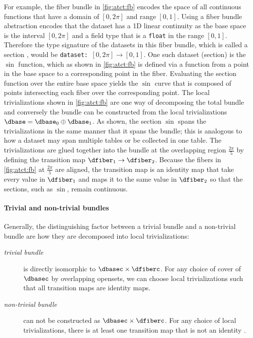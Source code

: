 For example, the fiber bundle in \autoref{fig:atct:fb} encodes the space of all continuous functions that have a domain of $[0, 2\pi]$ and range $[0,1]$. Using a fiber bundle abstraction encodes that the dataset has a 1D linear continuity as the base space \dbase is the interval $[0,2\pi]$ and a field type that is a \texttt{float} in the range $[0,1]$. Therefore the type signature of the datasets in this fiber bundle, which is called a section \dsection, would be \texttt{dataset: $[0, 2\pi] \rightarrow [0,1]$}. One such dataset (section) is the $\sin$ function, which as shown in \autoref{fig:atct:fb} is defined via a function \dsection from a point in the base space to a corresponding point in the fiber. Evaluating the section function over the entire base space yields the $\sin$ curve that is composed of points intersecting each fiber over the corresponding point. The local trivializations shown in \autoref{fig:atct:fb} are one way of decomposing the total bundle and conversely the bundle can be constructed from the local trivializations $\dbase = \dbase_{0} \oplus \dbase_{1}$. As shown, the section $\sin$ spans the trivializations in the same manner that it spans the bundle; this is analogous to how a dataset may span multiple tables or be collected in one table. The trivializations are glued together into the bundle at the overlapping region $\frac{2\pi}{5}$ by defining the transition map $\dfiber_{1} \rightarrow \dfiber_{2}$. Because the fibers in \autoref{fig:atct:fb} at $\frac{2\pi}{5}$ are aligned, the transition map is an identity map that take every value in $\dfiber_1$ and maps it to the same value in $\dfiber_2$ so that the sections, such as $\sin$, remain continuous.

\paragraph{Trivial and non-trivial bundles}
\label{sec:appendix:bundle_triviality}

Generally, the distinguishing factor between a trivial bundle and a non-trivial bundle are how they are decomposed into local trivializations:
\begin{description}
  \item[\textit{trivial bundle}] is directly isomorphic to $\dbasec\times\dfiberc$. For any choice of cover of $\dbasec$ by overlapping opensets, we can choose local trivializations such that all transition maps are identity maps.
  \item[\textit{non-trivial bundle}] can not be constructed as $\dbasec\times\dfiberc$. For any choice of local trivializations, there is at least one transition map that is not an identity \cite{hatcherAlgebraicTopology2002}.
\end{description}


